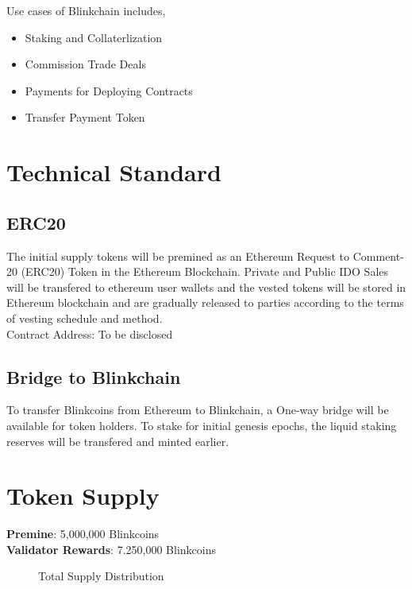 \documentclass[a4paper,12pt]{article}
\begin{document}
Use cases of Blinkchain includes,
\begin{itemize}
\item Staking and Collaterlization
\item Commission Trade Deals
\item Payments for Deploying Contracts
\item Transfer Payment Token
\end{itemize}

\section{Technical Standard}

\subsection{ERC20}

The initial supply tokens will be premined as an Ethereum Request to Comment- 20 (ERC20) Token in the Ethereum Blockchain. Private and Public IDO Sales will be transfered to ethereum user wallets and the vested tokens will be stored in Ethereum blockchain and are gradually released to parties according to the terms of vesting schedule and method.\\

Contract Address: To be disclosed

\subsection{Bridge to Blinkchain}

To transfer Blinkcoins from Ethereum to Blinkchain, a One-way bridge will be available for token holders. To stake for initial genesis epochs, the liquid staking reserves will be transfered and minted earlier.

\section{Token Supply}

\textbf{Premine}: 5,000,000 Blinkcoins\\
\textbf{Validator Rewards}: 7.250,000 Blinkcoins

\begin{center}
\begin{figure}[H]
\centering
{}
\caption{Total Supply Distribution}
\end{figure}
\end{center}
\end{document}
